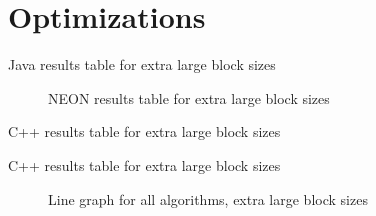


\section{Optimizations}

\begin{table}
    \centering
    \caption{Java results table for extra large block sizes}
    \label{tab:java:extra}
    
\end{table}

\begin{figure}
    \centering
    
    \caption{NEON results table for extra large block sizes}
    \label{fig:neon:line:extra}
\end{figure}

\begin{table}
    \centering
    
    \caption{C++ results table for extra large block sizes}
    \label{tab:cpp:extra}
\end{table}

\begin{table}
    \centering
    \resizebox{\columnwidth}{!}{
        
    }
    \caption{C++ results table for extra large block sizes}
    \label{tab:cpp:extra}
\end{table}

\begin{figure}
    \centering
    
    \caption{Line graph for all algorithms, extra large block sizes}
    \label{fig:all:line:extra}
\end{figure}

